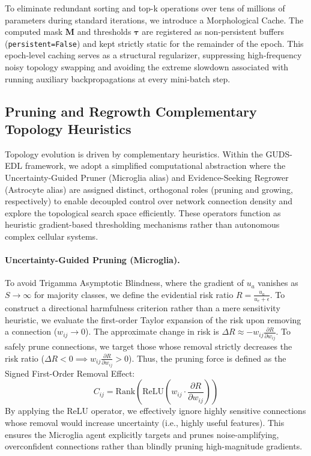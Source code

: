 \documentclass[letterpaper]{article} %
\begin{document}
To eliminate redundant sorting and top-k operations over tens of millions of parameters during standard iterations, we introduce a Morphological Cache. The computed mask $\bm{M}$ and thresholds $\bm{\tau}$ are registered as non-persistent buffers (\texttt{persistent=False}) and kept strictly static for the remainder of the epoch. This epoch-level caching serves as a structural regularizer, suppressing high-frequency noisy topology swapping and avoiding the extreme slowdown associated with running auxiliary backpropagations at every mini-batch step.

\subsection{Pruning and Regrowth Complementary Topology Heuristics}
Topology evolution is driven by complementary heuristics. Within the GUDS-EDL framework, we adopt a simplified computational abstraction where the Uncertainty-Guided Pruner (Microglia alias) and Evidence-Seeking Regrower (Astrocyte alias) are assigned distinct, orthogonal roles (pruning and growing, respectively) to enable decoupled control over network connection density and explore the topological search space efficiently. These operators function as heuristic gradient-based thresholding mechanisms rather than autonomous complex cellular systems.

\paragraph{Uncertainty-Guided Pruning (Microglia).}
To avoid Trigamma Asymptotic Blindness, where the gradient of $u_a$ vanishes as $S \to \infty$ for majority classes, we define the evidential risk ratio $R = \frac{u_a}{u_e + \epsilon}$. To construct a directional harmfulness criterion rather than a mere sensitivity heuristic, we evaluate the first-order Taylor expansion of the risk upon removing a connection ($w_{ij} \to 0$). The approximate change in risk is $\Delta R \approx -w_{ij} \frac{\partial R}{\partial w_{ij}}$. To safely prune connections, we target those whose removal strictly decreases the risk ratio ($\Delta R < 0 \implies w_{ij} \frac{\partial R}{\partial w_{ij}} > 0$). Thus, the pruning force is defined as the Signed First-Order Removal Effect:
\begin{equation}\label{eq:C_ij}
    C_{ij} = \text{Rank}\left( \text{ReLU}\left( w_{ij} \cdot \frac{\partial R}{\partial w_{ij}} \right) \right)
\end{equation}
By applying the ReLU operator, we effectively ignore highly sensitive connections whose removal would increase uncertainty (i.e., highly useful features). This ensures the Microglia agent explicitly targets and prunes noise-amplifying, overconfident connections rather than blindly pruning high-magnitude gradients.
\end{document}
